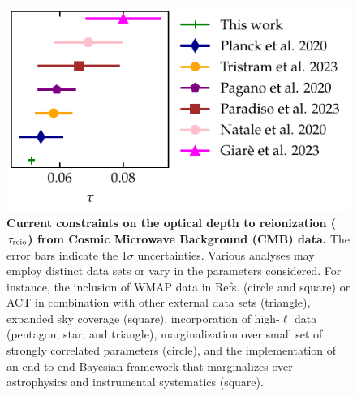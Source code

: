 \begin{figure}
\centering
\includegraphics{figs/tau_fig.pdf}
\caption{\textbf{Current constraints on the optical depth to
reionization ($\tau_{\mathrm{reio}}$) from Cosmic Microwave Background (CMB)
data.}
The error bars indicate the 1$\sigma$ uncertainties.
Various analyses may employ distinct data sets or vary in the parameters
considered.
For instance, the inclusion of WMAP data in Refs.
\cite{Natale2020,Paradiso2023} (circle and square) or ACT in combination
with other external data sets \cite{Giare2023} (triangle), expanded sky
coverage \cite{Paradiso2023} (square), incorporation of high-$\ell$ data
\cite{Pagano2020,Planck2020a,Giare2023} (pentagon, star, and triangle),
marginalization over small set of strongly correlated parameters
\cite{Natale2020} (circle), and the implementation of an end-to-end
Bayesian framework that marginalizes over astrophysics and instrumental
systematics \cite{Paradiso2023} (square).}
\label{fig:tau}
\end{figure}

